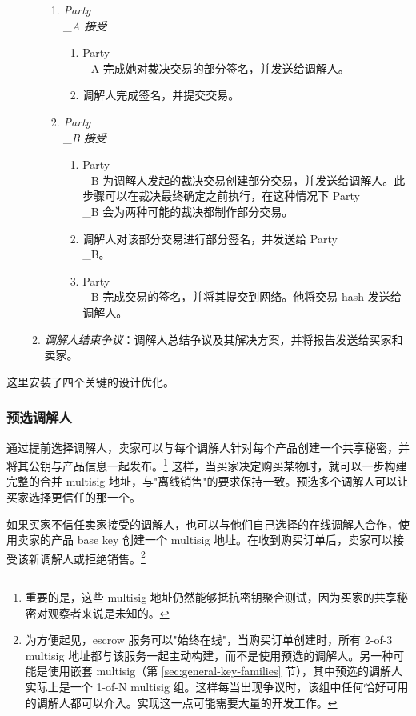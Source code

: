 \begin{enumerate}
\begin{enumerate}
        \begin{enumerate}
            \item {\em Party\\_A 接受}
            \begin{enumerate}
                \item Party\\_A 完成她对裁决交易的部分签名，并发送给调解人。
                \item 调解人完成签名，并提交交易。
            \end{enumerate}{}
            \item {\em Party\\_B 接受}
            \begin{enumerate}
                \item Party\\_B 为调解人发起的裁决交易创建部分交易，并发送给调解人。此步骤可以在裁决最终确定之前执行，在这种情况下 Party\\_B 会为两种可能的裁决都制作部分交易。
                \item 调解人对该部分交易进行部分签名，并发送给 Party\\_B。
                \item Party\\_B 完成交易的签名，并将其提交到网络。他将交易 hash 发送给调解人。
            \end{enumerate}{}
        \end{enumerate}{}
        \item {\em 调解人结束争议}：调解人总结争议及其解决方案，并将报告发送给买家和卖家。
    \end{enumerate}{}
\end{enumerate}{}

这里安装了四个关键的设计优化。

\subsubsection*{预选调解人}

通过提前选择调解人，卖家可以与每个调解人针对每个产品创建一个共享秘密，并将其公钥与产品信息一起发布。\footnote{重要的是，这些 multisig 地址仍然能够抵抗密钥聚合测试，因为买家的共享秘密对观察者来说是未知的。} 这样，当买家决定购买某物时，就可以一步构建完整的合并 multisig 地址，与"离线销售"的要求保持一致。预选多个调解人可以让买家选择更信任的那一个。

如果买家不信任卖家接受的调解人，也可以与他们自己选择的在线调解人合作，使用卖家的产品 base key 创建一个 multisig 地址。在收到购买订单后，卖家可以接受该新调解人或拒绝销售。\footnote{为方便起见，escrow 服务可以"始终在线"，当购买订单创建时，所有 2-of-3 multisig 地址都与该服务一起主动构建，而不是使用预选的调解人。另一种可能是使用嵌套 multisig（第 \ref{sec:general-key-families} 节），其中预选的调解人实际上是一个 1-of-N multisig 组。这样每当出现争议时，该组中任何恰好可用的调解人都可以介入。实现这一点可能需要大量的开发工作。}

